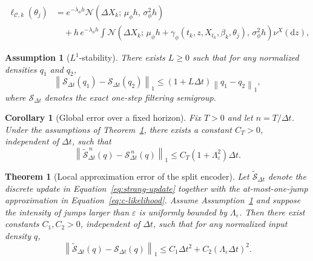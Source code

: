 \documentclass[10pt,a4paper]{amsart}
\newtheorem{assumption}{Assumption}
\newtheorem{theorem}{Theorem}
\newtheorem{corollary}{Corollary}
\begin{document}
\begin{align}
\ell_{\mathcal{C},k}(\theta_j)
&=
e^{-\lambda_{\phi}h}
\mathcal{N}\!\left(
\Delta X_k;\,
\mu_{\phi}h,\,
\sigma_{\phi}^2 h
\right)
\nonumber\\
&\quad
+
h\,e^{-\lambda_{\phi}h}
\int
\mathcal{N}\!\left(
\Delta X_k;\,
\mu_{\phi}h+\gamma_{\phi}(t_k,z,X_{t_k},\beta_k,\theta_j),\,
\sigma_{\phi}^2 h
\right)\nu^X(\mathrm{d} z),
\label{eq:c-likelihood}
\end{align}

\begin{assumption}[$L^1$-stability]
\label{ass:l1-stability}
There exists $L \ge 0$ such that for any normalized densities $q_1$ and $q_2$,
\begin{equation*}
\left\lVert
\mathcal{S}_{\Delta t}(q_1)-\mathcal{S}_{\Delta t}(q_2)
\right\rVert_1
\le
(1+L\Delta t)
\left\lVert q_1-q_2 \right\rVert_1,
\end{equation*}
where $\mathcal{S}_{\Delta t}$ denotes the exact one-step filtering semigroup.
\end{assumption}

\begin{corollary}[Global error over a fixed horizon]
\label{cor:global-error}
Fix $T>0$ and let $n=T/\Delta t$. Under the assumptions of Theorem~\ref{thm:local-error}, there exists a constant $C_T>0$, independent of $\Delta t$, such that
\begin{equation*}
\left\lVert
\widetilde{\mathcal{S}}_{\Delta t}^{\,n}(q)
-
\mathcal{S}_{\Delta t}^{\,n}(q)
\right\rVert_1
\le
C_T(1+\Lambda_{\varepsilon}^2)\Delta t.
\end{equation*}
\end{corollary}

\begin{theorem}[Local approximation error of the split encoder]
\label{thm:local-error}
Let $\widetilde{\mathcal{S}}_{\Delta t}$ denote the discrete update in Equation~\eqref{eq:strang-update} together with the at-most-one-jump approximation in Equation~\eqref{eq:c-likelihood}. Assume Assumption~\ref{ass:l1-stability} and suppose the intensity of jumps larger than $\varepsilon$ is uniformly bounded by $\Lambda_{\varepsilon}$. Then there exist constants $C_1,C_2>0$, independent of $\Delta t$, such that for any normalized input density $q$,
\begin{equation*}
\left\lVert
\widetilde{\mathcal{S}}_{\Delta t}(q)-\mathcal{S}_{\Delta t}(q)
\right\rVert_1
\le
C_1\Delta t^2
+
C_2(\Lambda_{\varepsilon}\Delta t)^2.
\end{equation*}
\end{theorem}
\end{document}
